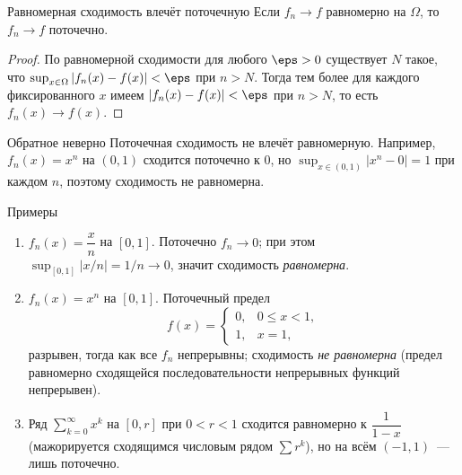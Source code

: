 \begin{Statement}{Равномерная сходимость влечёт поточечную}{}
	Если $f_n \to f$ равномерно на $\Omega$, то $f_n \to f$ поточечно.
\end{Statement}

\begin{proof}
	По равномерной сходимости для любого $\eps > 0$ существует $N$ такое, что $\sup_{x \in \Omega} |f_n(x) - f(x)| < \eps$ при $n > N$. Тогда тем более для каждого фиксированного $x$ имеем $|f_n(x) - f(x)| < \eps$ при $n > N$, то есть $f_n(x) \to f(x)$.
\end{proof}

\begin{Remark}{Обратное неверно}{}
	Поточечная сходимость не влечёт равномерную. Например, $f_n(x) = x^n$ на $(0, 1)$ сходится поточечно к $0$, но $\sup_{x \in (0,1)} |x^n - 0| = 1$ при каждом $n$, поэтому сходимость не равномерна.
\end{Remark}

\begin{Example}{Примеры}{}
	\begin{enumerate}
		\item $f_n(x) = \dfrac{x}{n}$ на $[0, 1]$. Поточечно $f_n \to 0$; при этом $\sup_{[0,1]} |x/n| = 1/n \to 0$, значит сходимость \emph{равномерна}.
		\item $f_n(x) = x^n$ на $[0, 1]$. Поточечный предел
		\[
		f(x) = \begin{cases} 0, & 0 \le x < 1, \\ 1, & x = 1, \end{cases}
		\]
		разрывен, тогда как все $f_n$ непрерывны; сходимость \emph{не равномерна} (предел равномерно сходящейся последовательности непрерывных функций непрерывен).
		\item Ряд $\sum_{k=0}^{\infty} x^k$ на $[0, r]$ при $0 < r < 1$ сходится равномерно к $\dfrac{1}{1 - x}$ (мажорируется сходящимся числовым рядом $\sum r^k$), но на всём $(-1, 1)$~--- лишь поточечно.
	\end{enumerate}
\end{Example}
